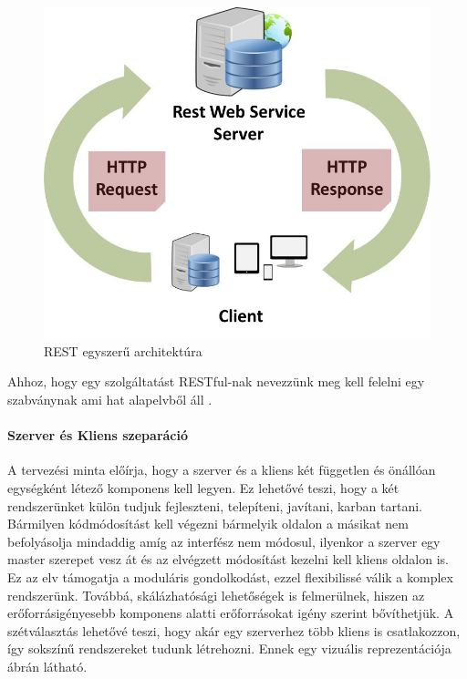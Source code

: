 \begin{figure}[t]
	\includegraphics[width=150mm, keepaspectratio]{figures/rest_structure.jpeg}
	\caption{REST egyszerű architektúra \cite{kep_rest}}
	\label{fig:rest_structure}
\end{figure}

Ahhoz, hogy egy szolgáltatást RESTful-nak nevezzünk meg kell felelni egy szabványnak ami hat alapelvből áll \cite{rest_1,rest_3}.


\paragraph{Szerver és Kliens szeparáció} A tervezési minta előírja, hogy a szerver és a kliens két független és önállóan egységként létező komponens kell legyen. Ez lehetővé teszi, hogy a két rendszerünket külön tudjuk fejleszteni, telepíteni, javítani, karban tartani. Bármilyen kódmódosítást kell végezni bármelyik oldalon a másikat nem befolyásolja mindaddig amíg az interfész nem módosul, ilyenkor a szerver egy master szerepet vesz át és az elvégzett módosítást kezelni kell kliens oldalon is. Ez az elv támogatja a moduláris gondolkodást, ezzel flexibilissé válik a komplex rendszerünk. Továbbá, skálázhatósági lehetőségek is felmerülnek, hiszen az erőforrásigényesebb komponens alatti erőforrásokat igény szerint bővíthetjük. A szétválasztás lehetővé teszi, hogy akár egy szerverhez több kliens is csatlakozzon, így sokszínű rendszereket tudunk létrehozni. Ennek egy vizuális reprezentációja  ábrán látható.
